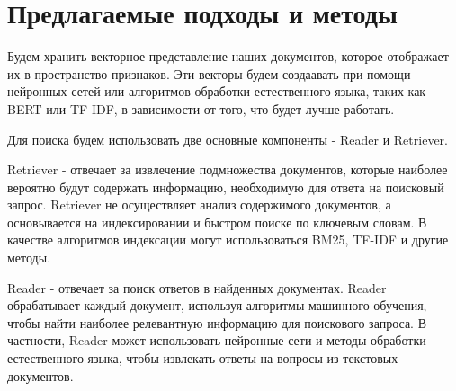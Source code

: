 \section{Предлагаемые подходы и методы}
Будем хранить векторное представление наших документов, которое отображает их в пространство признаков. 
Эти векторы будем создаавать при помощи нейронных сетей 
или алгоритмов обработки естественного языка, таких как BERT или TF-IDF, в зависимости от того, что будет лучше работать.

Для поиска будем использовать две основные компоненты - Reader и Retriever. 

Retriever - отвечает за извлечение подмножества документов, которые наиболее вероятно будут содержать информацию, 
необходимую для ответа на поисковый запрос. Retriever не осуществляет анализ содержимого документов, 
а основывается на индексировании и быстром поиске по ключевым словам.
В качестве алгоритмов индексации могут использоваться BM25, TF-IDF и другие методы.

Reader - отвечает за поиск ответов в найденных документах. Reader обрабатывает каждый документ, 
используя алгоритмы машинного обучения, чтобы найти наиболее релевантную информацию для поискового запроса. 
В частности, Reader может использовать нейронные сети и методы обработки естественного языка, 
чтобы извлекать ответы на вопросы из текстовых документов.